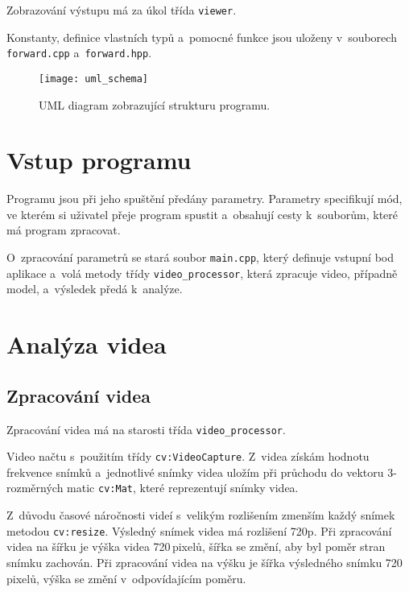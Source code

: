 Zobrazování výstupu má za úkol třída \texttt{viewer}.

Konstanty, definice vlastních typů a~pomocné funkce jsou uloženy v~souborech \texttt{forward.cpp} a~\texttt{forward.hpp}.

\begin{figure}[h]\centering
\texttt{[image: uml\_schema]}
\caption{UML diagram zobrazující strukturu programu.}
\label{fig:uml_schema}
\end{figure}






\section{Vstup programu}

Programu jsou při jeho spuštění předány parametry. Parametry specifikují mód, ve kterém si uživatel přeje program spustit a~obsahují cesty k~souborům, které má program zpracovat.

O~zpracování parametrů se stará soubor \texttt{main.cpp}, který definuje vstupní bod aplikace a~volá metody třídy \texttt{video\_processor}, která zpracuje video, případně model, a~výsledek předá k~analýze.




\section{Analýza videa}

\subsection{Zpracování videa}

Zpracování videa má na starosti třída \texttt{video\_processor}. 

Video načtu s~použitím třídy \texttt{cv\::VideoCapture}. Z~videa získám hodnotu frekvence snímků a~jednotlivé snímky videa uložím při průchodu do vektoru $3$-rozměrných matic \texttt{cv\::Mat}, které reprezentují snímky videa.

Z~důvodu časové náročnosti videí s~velikým rozlišením zmenším každý snímek metodou \texttt{cv\::resize}. Výsledný snímek videa má rozlišení 720p. Při zpracování videa na šířku je výška videa 720\,\rm pixelů, šířka se změní, aby byl poměr stran snímku zachován. Při zpracování videa na výšku je šířka výsledného snímku 720\,\rm pixelů, výška se změní v~odpovídajícím poměru.

